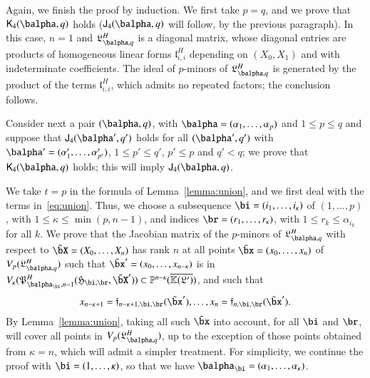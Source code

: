 \documentclass[amsthm]{elsart}
\begin{document}
Again, we finish the proof by induction. We first take $p=q$, and we
prove that $\assJ_4(\balpha,q)$ holds ($\assI_4(\balpha,q)$ will
follow, by the previous paragraph). In this case, $n=1$ and
$\mathfrak{L}^H_{\balpha,q}$ is a diagonal matrix, whose diagonal
entries are products of homogeneous linear forms
$\mathfrak{l}^H_{i,i}$ depending on $(X_0,X_1)$ and with indeterminate
coefficients. The ideal of $p$-minors of $\mathfrak{L}^H_{\balpha,q}$
is generated by the product of the terms $\mathfrak{l}^H_{i,i}$, which
admits no repeated factors; the conclusion follows.

Consider next a pair $(\balpha,q)$, with
$\balpha=(\alpha_1,\dots,\alpha_p)$ and $1 \le p \le q$ and suppose
that $\assI_4(\balpha',q')$ holds for all $(\balpha',q')$ with
$\balpha'=(\alpha'_1,\dots,\alpha'_{p'})$, $1 \le p' \le q'$, $p' \le
p$ and $q' < q$; we prove that $\assJ_4(\balpha,q)$ holds; this will
imply $\assI_4(\balpha,q)$.

We take $t=p$ in the formula of Lemma~\ref{lemma:union}, and we first
deal with the terms in~\eqref{eq:union}.  Thus, we choose a
subsequence $\bi=(i_1,\dots,i_\kappa)$ of $(1,\dots,p)$, with $1 \le \kappa\le
\min(p,n-1)$, and indices $\br=(r_1,\dots,r_\kappa)$, with $ 1\le r_k \le
\alpha_{i_k}$ for all $k$. We prove that the Jacobian matrix of the $p$-minors of $\mathfrak{L}^H_{\balpha,q}$
with respect to $\tilde\bX=(X_0,\dots,X_n)$ has rank $n$ at all points $\tilde\bx=(x_0,\dots,x_n)$ of
$V_p(\mathfrak{L}^H_{\balpha,q})$  such that
$\tilde\bx'=(x_0,\dots,x_{n-\kappa})$ is in
$V_\kappa(\mathfrak{P}^H_{\balpha_\bi,n-1}(\mathfrak{H}_{\bi,\br},\tilde\bX')) \subset
\P^{n-\kappa}(\KKGpbar)$, and such that
\begin{align}\label{eq:subsX}
  x_{n-\kappa+1}=\mathfrak{f}_{n-\kappa+1,\bi,\br}(\tilde\bx'),\dots,x_{n}=\mathfrak{f}_{n,\bi,\br}(\tilde\bx').
\end{align}
By Lemma~\ref{lemma:union}, taking all such $\tilde\bx$ into account,
for all $\bi$ and $\br$, will cover all points in
$V_p(\mathfrak{L}^H_{\balpha,q})$, up to the exception of those points
obtained from $\kappa=n$, which will admit a simpler treatment.
For simplicity, we continue the proof with $\bi=(1,\dots,\kappa)$, so
that we have $\balpha_\bi=(\alpha_1,\dots,\alpha_\kappa)$.  
\end{document}
